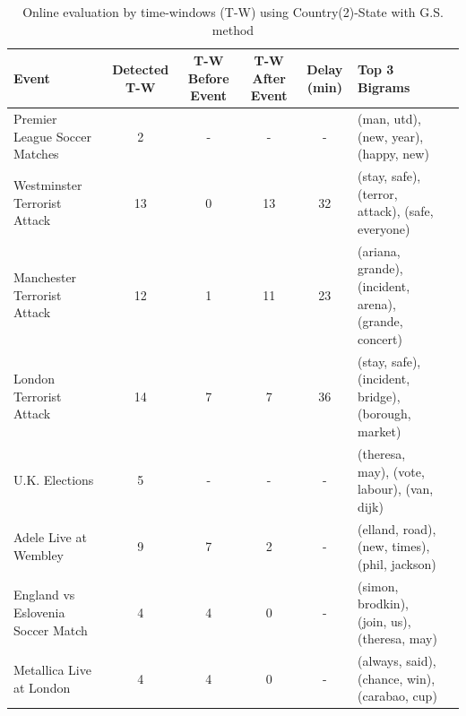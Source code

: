 \documentclass[sigconf]{acmart}
\begin{document}
\begin{table}
	\caption{Online evaluation by time-windows (T-W) using Country(2)-State with G.S. method}
	\label{tab:online1}
	\begin{tabular}{lccccp{3.5cm}c}
		\toprule
		Event &Detected T-W & T-W Before Event & T-W After Event & Delay (min) & Top 3 Bigrams\\
		\midrule
		Premier League Soccer Matches & 2& - & - & - & \small{(man, utd), (new, year), (happy, new)} \\
		Westminster Terrorist Attack& 13 & 0 &13 & 32& \small{(stay, safe), (terror, attack), (safe, everyone)}\\
		Manchester Terrorist Attack& 12& 1& 11& 23& \small{(ariana, grande), (incident, arena), (grande, concert)}\\
		London Terrorist Attack & 14 & 7 & 7 & 36 & \small{(stay, safe), (incident, bridge), (borough, market)}\\
		U.K. Elections& 5 & - & - & - & \small{(theresa, may), (vote, labour), (van, dijk)}\\
		Adele Live at Wembley& 9& 7&2&-& \small{(elland, road), (new, times), (phil, jackson)}\\
		England vs Eslovenia Soccer Match & 4& 4 & 0 & - & \small{(simon, brodkin), (join, us), (theresa, may)}\\
		Metallica Live at London& 4 & 4 & 0 & - & \small{(always, said), (chance, win), (carabao, cup)}\\
		\bottomrule
	\end{tabular}
\end{table}
\end{document}
